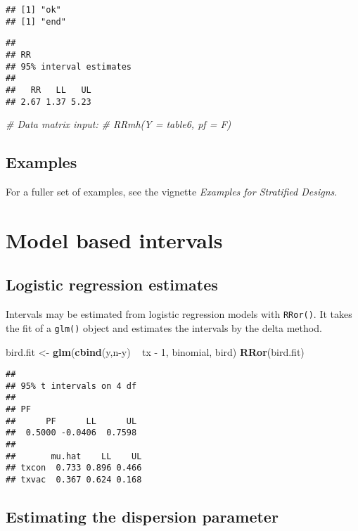\documentclass[]{article}
\newenvironment{Shaded}{\begin{snugshade}}{\end{snugshade}}
\newcommand{\KeywordTok}[1]{\textcolor[rgb]{0.13,0.29,0.53}{\textbf{{#1}}}}
\newcommand{\DecValTok}[1]{\textcolor[rgb]{0.00,0.00,0.81}{{#1}}}
\newcommand{\StringTok}[1]{\textcolor[rgb]{0.31,0.60,0.02}{{#1}}}
\newcommand{\CommentTok}[1]{\textcolor[rgb]{0.56,0.35,0.01}{\textit{{#1}}}}
\newcommand{\NormalTok}[1]{{#1}}
\begin{document}
\begin{verbatim}
## [1] "ok"
## [1] "end"
\end{verbatim}

\begin{verbatim}
## 
## RR 
## 95% interval estimates
## 
##   RR   LL   UL 
## 2.67 1.37 5.23
\end{verbatim}

\begin{Shaded}
\begin{Highlighting}[]
\CommentTok{# Data matrix input:}
\CommentTok{# RRmh(Y = table6, pf = F)}
\end{Highlighting}
\end{Shaded}

\subsection{Examples}

For a fuller set of examples, see the vignette
\emph{Examples for Stratified Designs}.

\section{Model based intervals}\subsection{Logistic regression estimates}

Intervals may be estimated from logistic regression models with
\texttt{RRor()}. It takes the fit of a \texttt{glm()} object and
estimates the intervals by the delta method.

\begin{Shaded}
\begin{Highlighting}[]
\NormalTok{bird.fit <-}\StringTok{ }\KeywordTok{glm}\NormalTok{(}\KeywordTok{cbind}\NormalTok{(y,n-y) ~}\StringTok{ }\NormalTok{tx -}\StringTok{ }\DecValTok{1}\NormalTok{, binomial, bird)}
\KeywordTok{RRor}\NormalTok{(bird.fit)}
\end{Highlighting}
\end{Shaded}

\begin{verbatim}
## 
## 95% t intervals on 4 df
## 
## PF 
##      PF      LL      UL 
##  0.5000 -0.0406  0.7598 
## 
##       mu.hat    LL    UL
## txcon  0.733 0.896 0.466
## txvac  0.367 0.624 0.168
\end{verbatim}

\subsection{Estimating the dispersion parameter}
\end{document}

